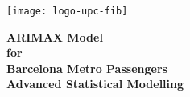 
\thispagestyle{empty}
\clearpage
\setcounter{page}{-1}

\renewcommand\and{\\[\baselineskip]}

\makeatletter
\begin{titlepage}
{
    \centering
    \texttt{[image: logo-upc-fib]}
    \null%
    \vspace{3em}
    {\Huge \bfseries ARIMAX Model \\ for \\ Barcelona Metro Passengers \\[2em] \Large
    Advanced Statistical Modelling
    \par}
    \vspace{6em}
    {\large \scshape \@date{} \par}

    \vfill
    {\raggedleft{} \large \bfseries \@author{} \par}
    \vspace{1em}
    \null%
}
\end{titlepage}
\makeatother

